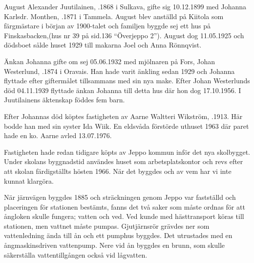 
August Alexander Juutilainen, .1868 i Sulkava, gifte sig 10.12.1899 med Johanna Karlsdr. Monthen, .1871 i Tammela. August blev anställd på Kiitola som färgmästare i början av 1900-talet och familjen byggde sej ett hus på Finskasbacken,(hus nr 39 på sid.136 ``Överjeppo 2''). August dog 11.05.1925 och dödsboet sålde huset 1929 till makarna Joel och Anna Rönnqvist.


Änkan Johanna gifte om sej 05.06.1932 med mjölnaren på Fors, Johan Westerlund, .1874 i Oravais. Han hade varit änkling sedan 1929 och Johanna flyttade efter giftermålet tillsammans med sin nya make. Efter Johan Westerlunds död 04.11.1939 flyttade änkan Johanna till detta hus där hon dog 17.10.1956. I Juutilainens äktenskap föddes fem barn.
\begin{jhchildren}
  \item {}
  \item {}
  \item {}
  \item {}
  \item {}
\end{jhchildren}
Efter Johannas död köptes fastigheten av Aarne Waltteri Wikström, .1913. Här bodde han med sin syster Ida Wiik. En eldsvåda förstörde uthuset 1963 där paret hade en ko. Aarne avled 13.07.1976.

Fastigheten hade redan tidigare köpts av Jeppo kommun inför det nya skolbygget. Under skolans byggnadstid användes huset som arbetsplatskontor och revs efter att skolan färdigställts hösten 1966. När det byggdes och av vem har vi inte kunnat klargöra.




När järnvägen byggdes 1885 och sträckningen genom Jeppo var fastställd och placeringen för stationen bestämts, fanns det två saker som måste ordnas för att ångloken skulle fungera; vatten och ved. Ved kunde med hästtransport köras till stationen, men vattnet måste pumpas. Gjutjärnsrör grävdes ner som vattenledning ända till ån och ett pumphus byggdes. Det utrustades med en ångmaskinsdriven vattenpump. Nere vid ån byggdes en brunn, som skulle säkerställa vattentillgången också vid lågvatten.

